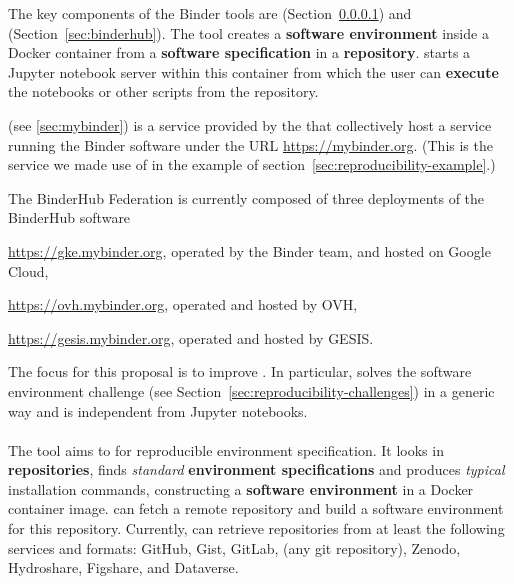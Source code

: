The key components of the Binder tools are \repotodocker{}
(Section~\ref{sec:repo2docker}) and \binderhub{} (Section~\ref{sec:binderhub}). The \repotodocker{} tool
creates a \textbf{software environment} inside a Docker container from a \textbf{software
specification} in a \textbf{repository}. \binderhub{} starts a Jupyter notebook server
within this container from which the user can \textbf{execute} the notebooks or other scripts from the
repository.

\emph{\mybinder{}} (see \ref{sec:mybinder}) is a service provided by the  that collectively host a service running the Binder software
under the URL \url{https://mybinder.org}. (This is the service we made use of in the example
of section~\ref{sec:reproducibility-example}.)

The BinderHub Federation is currently composed of three deployments of the BinderHub software

\begin{compactitem}
\item \url{https://gke.mybinder.org}, operated by the Binder team, and hosted on Google Cloud,
\item \url{https://ovh.mybinder.org}, operated and hosted by OVH,
\item \url{https://gesis.mybinder.org}, operated and hosted by GESIS.
\end{compactitem}

The focus for this proposal is to improve \repotodocker{}. In particular,
\repotodocker{} solves the software environment challenge (see
Section~\ref{sec:reproducibility-challenges}) in a generic way and is independent
from Jupyter notebooks.


\paragraph{\repotodocker}\label{sec:repo2docker}
The \repotodocker{} tool aims to  for reproducible environment specification.
It looks in \textbf{repositories}, finds \emph{standard} \textbf{environment specifications} and produces \emph{typical} installation commands,
constructing a \textbf{software environment} in a Docker container image.
\repotodocker{} can fetch a remote repository and build a software
environment for this repository. Currently, \repotodocker{} can retrieve
repositories from at least the following services and formats: GitHub, Gist, GitLab, (any git repository),
Zenodo, Hydroshare, Figshare, and Dataverse.

